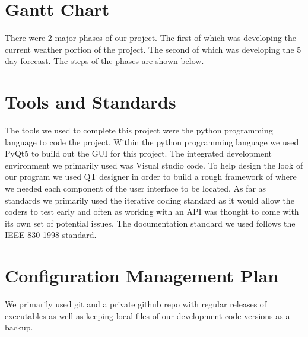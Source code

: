 \documentclass[12pt, titlepage]{article}
\begin{document}
\pagebreak
\section*{Gantt Chart}

There were 2 major phases of our project.  The first of which was developing the current weather portion of the project.  The second of which was developing the 5 day forecast.  The steps of the phases are shown below.

\begin{center}
\end{center}

\section*{Tools and Standards}

The tools we used to complete this project were the python programming language to code the project.  Within the python programming language we used PyQt5 to build out the GUI for this project.  The integrated development environment we primarily used was Visual studio code.  To help design the look of our program we used QT designer in order to build a rough framework of where we needed each component of the user interface to be located.
As far as standards we primarily used the iterative coding standard as it would allow the coders to test early and often as working with an API was thought to come with its own set of potential issues.  The documentation standard we used follows the IEEE 830-1998 standard.

\section*{Configuration Management Plan}

We primarily used git and a private github repo with regular releases of executables as well as keeping local files of our development code versions as a backup.
\end{document}
